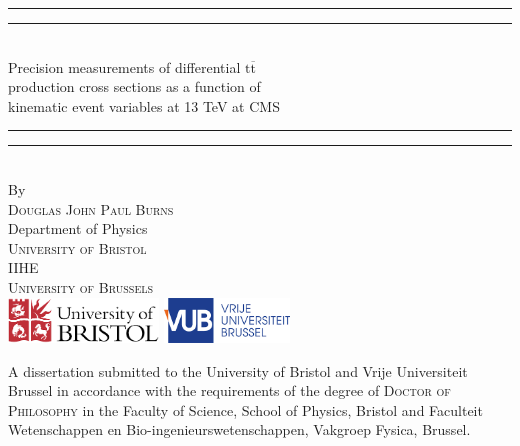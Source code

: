 
\begin{titlepage}
\vspace*{13mm}
\begin{center}
\rule[0.5ex]{\linewidth}{2pt}\vspace*{-\baselineskip}\vspace*{3.2pt}
\rule[0.5ex]{\linewidth}{1pt}\\[\baselineskip]
{\Huge Precision measurements of differential $\mathrm{t\overline{t}}$}\\
\vspace*{4pt}
{\Huge  production cross sections as a function of }\\
\vspace*{4pt}
{\Huge kinematic event variables at 13 TeV at CMS} \\
\vspace{4mm}
\rule[0.5ex]{\linewidth}{1pt}\vspace*{-\baselineskip}\vspace{3.2pt}
\rule[0.5ex]{\linewidth}{2pt}\\
\vspace{6.5mm}
{\large By}\\
\vspace{6.5mm}
{\large\textsc{Douglas John Paul Burns}}\\
\vspace{12mm}
{\large Department of Physics\\
\vspace{1mm}
\textsc{University of Bristol}}\\
\vspace{3mm}
{\large IIHE\\
\vspace{1mm}
\textsc{University of Brussels}}\\
\vspace{12mm}
\includegraphics[width=0.3\textwidth]{Figures/UOB}
\includegraphics[width=0.25\textwidth]{Figures/VUB} \\
\vspace{16mm}
\begin{minipage}{15cm}
A dissertation submitted to the University of Bristol and Vrije Universiteit Brussel in accordance with the requirements of the degree of \textsc{Doctor of Philosophy} in the Faculty of Science, School of Physics, Bristol and Faculteit Wetenschappen en Bio-ingenieurswetenschappen, Vakgroep Fysica, Brussel.

\end{minipage}
\end{center}
\end{titlepage}
